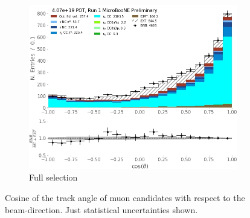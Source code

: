 \begin{figure}[ht]
\begin{center}
\begin{subfigure}[b]{0.45\textwidth}
    \end{subfigure} \newline
    \begin{subfigure}[b]{0.45\textwidth}
    \centering
    \includegraphics[width=1.00\textwidth]{NuMuCCsel/Images/Ryan/Run1_costheta_fullsel.jpg}
    \caption{\label{fig:NuMUCCsel:ryan:trklenFull} Full selection}
    \end{subfigure}
\caption{Cosine of the track angle of muon candidates with respect to the beam-direction. Just statistical uncertainties shown.}
\end{center}
\end{figure}

